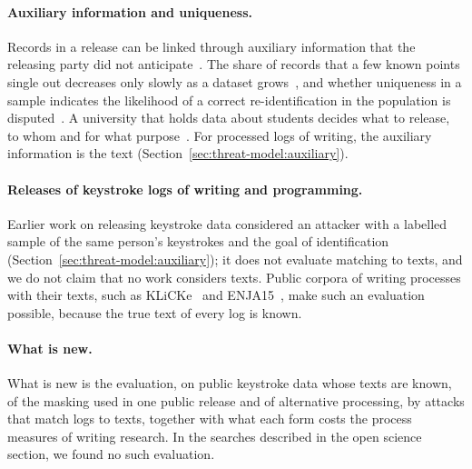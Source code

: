 \paragraph{Auxiliary information and uniqueness.}
Records in a release can be linked through auxiliary information that the releasing party did not
anticipate~\cite{narayanan2008robust}. The share of records that a few known points single out decreases only slowly
as a dataset grows~\cite{farzanehfar2021risk}, and whether uniqueness in a sample indicates the likelihood of a
correct re-identification in the population is disputed~\cite{sanchez2016comment,rocher2019estimating}. A university
that holds data about students decides what to release, to whom and for what purpose~\cite{borgman2018open}. For
processed logs of writing, the auxiliary information is the text (Section~\ref{sec:threat-model:auxiliary}).

\paragraph{Releases of keystroke logs of writing and programming.}
Earlier work on releasing keystroke data considered an attacker with a labelled sample of the same person's keystrokes
and the goal of identification (Section~\ref{sec:threat-model:auxiliary}); it does not evaluate matching to texts, and
we do not claim that no work considers texts. Public corpora of writing processes with their texts, such as KLiCKe~\cite{tian2025klicke}
and ENJA15~\cite{carl2016lrec}, make such an evaluation possible, because the true text of every log is known.

\paragraph{What is new.}
What is new is the evaluation, on public keystroke data whose texts are known, of the masking used in one public release and
of alternative processing, by attacks that match logs to texts, together with what each form costs the process measures
of writing research. In the searches described in the open science section, we found no such evaluation.
